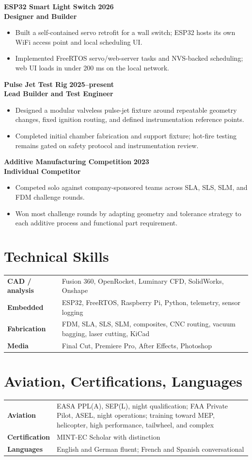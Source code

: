 \documentclass[10pt,letterpaper]{article}
\newcommand{\project}[4]{
  \textbf{#1} \hfill {\color{muted}\textbf{#4}}\\
  {\color{accent}\textbf{#2}} \hfill {\color{muted}#3}
  \vspace{2pt}
}
\begin{document}
\project{ESP32 Smart Light Switch}{Designer and Builder}{}{2026}
\begin{itemize}
  \item Built a self-contained servo retrofit for a wall switch; ESP32 hosts its own WiFi access point and local scheduling UI.
  \item Implemented FreeRTOS servo/web-server tasks and NVS-backed scheduling; web UI loads in under 200 ms on the local network.
\end{itemize}

\project{Pulse Jet Test Rig}{Lead Builder and Test Engineer}{}{2025--present}
\begin{itemize}
  \item Designed a modular valveless pulse-jet fixture around repeatable geometry changes, fixed ignition routing, and defined instrumentation reference points.
  \item Completed initial chamber fabrication and support fixture; hot-fire testing remains gated on safety protocol and instrumentation review.
\end{itemize}

\project{Additive Manufacturing Competition}{Individual Competitor}{}{2023}
\begin{itemize}
  \item Competed solo against company-sponsored teams across SLA, SLS, SLM, and FDM challenge rounds.
  \item Won most challenge rounds by adapting geometry and tolerance strategy to each additive process and functional part requirement.
\end{itemize}

\section{Technical Skills}
\begin{tabularx}{\textwidth}{>{\bfseries}p{1.35in}X}
CAD / analysis & Fusion 360, OpenRocket, Luminary CFD, SolidWorks, Onshape\\
Embedded & ESP32, FreeRTOS, Raspberry Pi, Python, telemetry, sensor logging\\
Fabrication & FDM, SLA, SLS, SLM, composites, CNC routing, vacuum bagging, laser cutting, KiCad\\
Media & Final Cut, Premiere Pro, After Effects, Photoshop\\
\end{tabularx}

\section{Aviation, Certifications, Languages}
\begin{tabularx}{\textwidth}{>{\bfseries}p{1.35in}X}
Aviation & EASA PPL(A), SEP(L), night qualification; FAA Private Pilot, ASEL, night operations; training toward MEP, helicopter, high performance, tailwheel, and complex\\
Certification & MINT-EC Scholar with distinction\\
Languages & English and German fluent; French and Spanish conversational\\
\end{tabularx}
\end{document}
